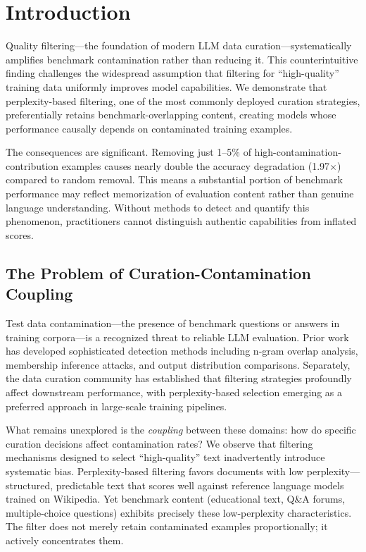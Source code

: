 \section{Introduction}

Quality filtering---the foundation of modern LLM data curation---systematically amplifies benchmark contamination rather than reducing it. This counterintuitive finding challenges the widespread assumption that filtering for ``high-quality'' training data uniformly improves model capabilities. We demonstrate that perplexity-based filtering, one of the most commonly deployed curation strategies, preferentially retains benchmark-overlapping content, creating models whose performance causally depends on contaminated training examples.

The consequences are significant. Removing just 1--5\% of high-contamination-contribution examples causes nearly double the accuracy degradation (1.97$\times$) compared to random removal. This means a substantial portion of benchmark performance may reflect memorization of evaluation content rather than genuine language understanding. Without methods to detect and quantify this phenomenon, practitioners cannot distinguish authentic capabilities from inflated scores.

\subsection{The Problem of Curation-Contamination Coupling}

Test data contamination---the presence of benchmark questions or answers in training corpora---is a recognized threat to reliable LLM evaluation. Prior work has developed sophisticated detection methods including n-gram overlap analysis, membership inference attacks, and output distribution comparisons. Separately, the data curation community has established that filtering strategies profoundly affect downstream performance, with perplexity-based selection emerging as a preferred approach in large-scale training pipelines.

What remains unexplored is the \textit{coupling} between these domains: how do specific curation decisions affect contamination rates? We observe that filtering mechanisms designed to select ``high-quality'' text inadvertently introduce systematic bias. Perplexity-based filtering favors documents with low perplexity---structured, predictable text that scores well against reference language models trained on Wikipedia. Yet benchmark content (educational text, Q\&A forums, multiple-choice questions) exhibits precisely these low-perplexity characteristics. The filter does not merely retain contaminated examples proportionally; it actively concentrates them.

